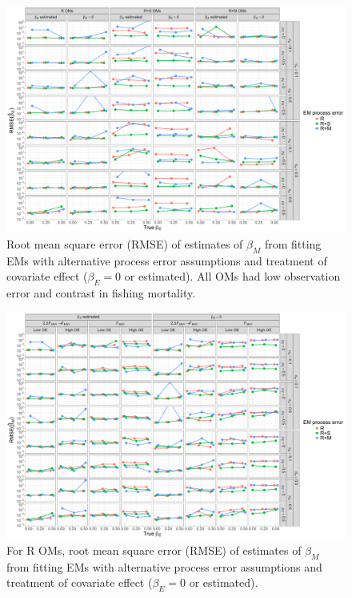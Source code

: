 \documentclass[
  12pt,
]{article}
\begin{document}
\begin{landscape}
\begin{figure}
\begin{center}
\includegraphics[height = \textheight]{beta_M_rmse_main}
\end{center}
\caption{Root mean square error  (RMSE) of estimates of  $\beta_M$ from fitting EMs with alternative process error assumptions and treatment of covariate effect ($\beta_E = 0$ or estimated). All OMs had low observation error and contrast in fishing mortality.}\label{beta_M_rmse}
\end{figure}
\end{landscape}

\begin{landscape}
\begin{figure}
\begin{center}
\includegraphics[height = \textheight]{beta_M_rmse_Rom}
\end{center}
\caption{For R OMs, root mean square error (RMSE) of estimates of  $\beta_M$ from fitting EMs with alternative process error assumptions and treatment of covariate effect ($\beta_E = 0$ or estimated).}\label{beta_M_rmse_Rom}
\end{figure}
\end{landscape}
\end{document}
